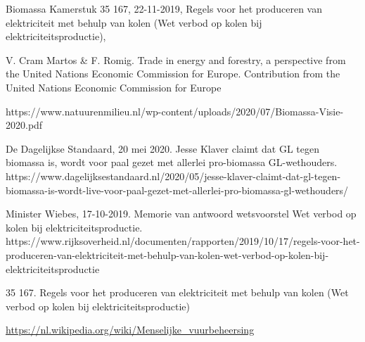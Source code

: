\begin{voorstel}{Biomassa}
Kamerstuk 35 167, 22-11-2019, Regels voor het produceren van elektriciteit met behulp van kolen (Wet verbod op kolen bij elektriciteitsproductie),

V. Cram Martos \& F. Romig. Trade in energy and forestry, a perspective from the United Nations Economic Commission for Europe. Contribution from the United Nations Economic Commission for Europe

https://www.natuurenmilieu.nl/wp-content/uploads/2020/07/Biomassa-Visie-2020.pdf

De Dagelijkse Standaard, 20 mei 2020. Jesse Klaver claimt dat GL tegen biomassa is, wordt voor paal gezet met allerlei pro-biomassa GL-wethouders. https://www.dagelijksestandaard.nl/2020/05/jesse-klaver-claimt-dat-gl-tegen-biomassa-is-wordt-live-voor-paal-gezet-met-allerlei-pro-biomassa-gl-wethouders/

Minister Wiebes, 17-10-2019. Memorie van antwoord wetsvoorstel Wet verbod op kolen bij elektriciteitsproductie. https://www.rijksoverheid.nl/documenten/rapporten/2019/10/17/regels-voor-het-produceren-van-elektriciteit-met-behulp-van-kolen-wet-verbod-op-kolen-bij-elektriciteitsproductie

35 167. Regels voor het produceren van elektriciteit met behulp van kolen (Wet verbod op kolen bij elektriciteitsproductie)

\url{https://nl.wikipedia.org/wiki/Menselijke_vuurbeheersing}

\end{voorstel}
